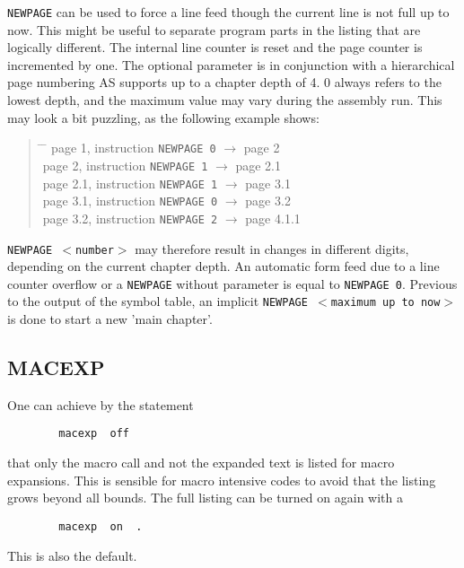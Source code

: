 \documentclass[12pt,twoside]{report}
\makeatletter
\newcommand{\tty}[1]{{\tt #1}}
\newcommand{\ttindex}[1]{\index{#1@{\tt #1}}}
\makeatother
\begin{document}
\tty{NEWPAGE} can be used to force a line feed though the current line is
not full up to now.  This might be useful to separate program parts
in the listing that are logically different.  The internal line
counter is reset and the page counter is incremented by one.  The
optional parameter is in conjunction with a hierarchical page
numbering AS supports up to a chapter depth of 4.  0 always refers to
the lowest depth, and the maximum value may vary during the assembly
run.  This may look a bit puzzling, as the following example shows:
\begin{quote}\begin{tabbing}
\hspace{2.5cm} \= \hspace{4.5cm} \= \kill
page 1,   \> instruction \tty{NEWPAGE 0} \>  $\rightarrow$ page 2 \\
page 2,   \> instruction \tty{NEWPAGE 1} \>  $\rightarrow$ page 2.1 \\
page 2.1, \> instruction \tty{NEWPAGE 1} \>  $\rightarrow$ page 3.1 \\
page 3.1, \> instruction \tty{NEWPAGE 0} \>  $\rightarrow$ page 3.2 \\
page 3.2, \> instruction \tty{NEWPAGE 2} \>  $\rightarrow$ page 4.1.1 \\
\end{tabbing}\end{quote} 
\tty{NEWPAGE $<$number$>$} may therefore result in
changes in different digits, depending on the current chapter depth.  An
automatic form feed due to a line counter overflow or a \tty{NEWPAGE}
without parameter is equal to \tty{NEWPAGE 0}.  Previous to the output of
the symbol table, an implicit \tty{NEWPAGE $<$maximum up to now$>$} is
done to start a new 'main chapter'.


\subsection{MACEXP}
\ttindex{MACEXP}

One can achieve by the statement
\begin{verbatim}
        macexp  off
\end{verbatim}
that only the macro call and not the expanded text is listed for
macro expansions.  This is sensible for macro intensive codes to
avoid that the listing grows beyond all bounds.  The full listing can
be turned on again with a
\begin{verbatim}
        macexp  on  .
\end{verbatim}
This is also the default.
\end{document}
